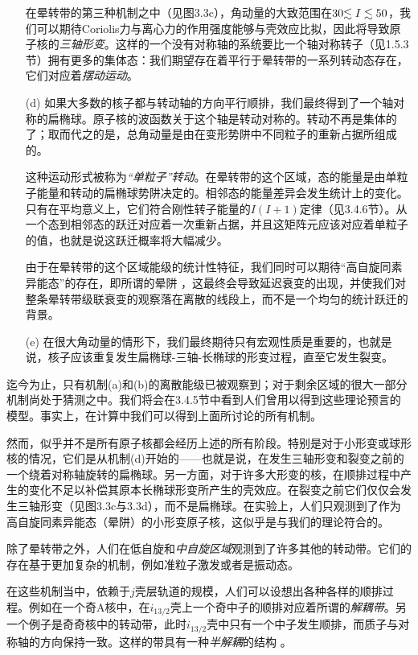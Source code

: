 \begin{enumerate}
在晕转带的第三种机制之中（见图3.3c），角动量的大致范围在$30\text{\ensuremath{\lesssim I\lesssim50}}$，我们可以期待Coriolis力与离心力的作用强度能够与壳效应比拟，因此将导致原子核的\emph{三轴形变}。这样的一个没有对称轴的系统要比一个轴对称转子（见1.5.3节）拥有更多的集体态：我们期望存在着平行于晕转带的一系列转动态存在，它们对应着\emph{摆动运动}。
\item[(d)] 如果大多数的核子都与转动轴的方向平行顺排，我们最终得到了一个轴对称的扁椭球。原子核的波函数关于这个轴是转动对称的。转动不再是集体的了；取而代之的是，总角动量是由在变形势阱中不同粒子的重新占据所组成的。

这种运动形式被称为\emph{“单粒子”转动}。在晕转带的这个区域，态的能量是由单粒子能量和转动的扁椭球势阱决定的。相邻态的能量差异会发生统计上的变化。只有在平均意义上，它们符合刚性转子能量的$I(I+1)$定律（见3.4.6节）。从一个态到相邻态的跃迁对应着一次重新占据，并且这矩阵元应该对应着单粒子的值，也就是说这跃迁概率将大幅减少。

由于在晕转带的这个区域能级的统计性特征，我们同时可以期待“高自旋同素异能态”的存在，即所谓的晕阱 \cite{BM74}，这最终会导致延迟衰变的出现，并使我们对整条晕转带级联衰变的观察落在离散的线段上，而不是一个均匀的统计跃迁的背景。
\item[(e)] 在很大角动量的情形下，我们最终期待只有宏观性质是重要的，也就是说，核子应该重复发生扁椭球-三轴-长椭球的形变过程，直至它发生裂变。
\end{enumerate}
迄今为止，只有机制(a)和(b)的离散能级已被观察到；对于剩余区域的很大一部分机制尚处于猜测之中。我们将会在3.4.5节中看到人们曾用以得到这些理论预言的模型。事实上，在计算中我们可以得到上面所讨论的所有机制。

然而，似乎并不是所有原子核都会经历上述的所有阶段。特别是对于小形变或球形核的情况，它们是从机制(d)开始的——也就是说，在发生三轴形变和裂变之前的一个绕着对称轴旋转的扁椭球。另一方面，对于许多大形变的核，在顺排过程中产生的变化不足以补偿其原本长椭球形变所产生的壳效应。在裂变之前它们仅仅会发生三轴形变（见图3.3c与3.3d），而不是扁椭球。在实验上，人们只观测到了作为高自旋同素异能态（晕阱）的小形变原子核，这似乎是与我们的理论符合的。

除了晕转带之外，人们在低自旋和\emph{中自旋区域}观测到了许多其他的转动带。它们的存在基于更加复杂的机制，例如准粒子激发或者是振动态。

在这些机制当中，依赖于$j$壳层轨道的规模，人们可以设想出各种各样的顺排过程。例如在一个奇A核中，在$i_{13/2}$壳上一个奇中子的顺排对应着所谓的\emph{解耦带}。另一个例子是奇奇核中的转动带，此时$i_{13/2}$壳中只有一个中子发生顺排，而质子与对称轴的方向保持一致。这样的带具有一种\emph{半解耦}的结构
\cite{NVR75}。

